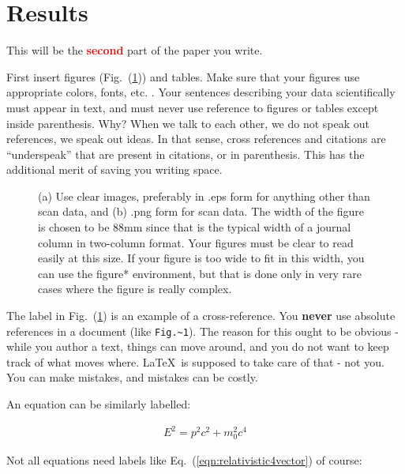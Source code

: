 \documentclass[12 pt]{article}
\begin{document}
\section{Results}
\label{sec:results}

This will be the \textbf{\Huge \textcolor{red}{second}} part of the paper you write.

First insert figures (Fig.~(\ref{fig:cv})) and tables. Make sure that your figures use appropriate colors, fonts, etc. \cite{mcnames:2006}. Your sentences describing your data scientifically must appear in text, and must never use reference to figures or tables except inside parenthesis. Why? When we talk to each other, we do not speak out references, we speak out ideas. In that sense, cross references and citations are ``underspeak'' that are present in citations, or in parenthesis. This has the additional merit of saving you writing space. 

\begin{figure}
\centering
{}
\caption{(a) Use clear images, preferably in .eps form for anything other than scan data, and (b) .png form for scan data. The width of the figure is chosen to be 88mm since that is the typical width of a journal column in two-column format. Your figures must be clear to read easily at this size. If your figure is too wide to fit in this width, you can use the figure* environment, but that is done only in very rare cases where the figure is really complex.}
\label{fig:cv}
\end{figure}

The label in Fig.~(\ref{fig:cv}) is an example of a cross-reference. You \textbf{never} use absolute references in a document (like \verb|Fig.~1|). The reason for this ought to be obvious - while you author a text, things can move around, and you do not want to keep track of what moves where. \LaTeX\ is supposed to take care of that - not you. You can make mistakes, and mistakes can be costly.

An equation can be similarly labelled:

\begin{align}
  E^{2} = p^{2} c^{2} + m_{0}^{2} c^{4} \label{eqn:relativistic4vector}
\end{align}

Not all equations need labels like Eq.~(\ref{eqn:relativistic4vector}) of course:
\end{document}
